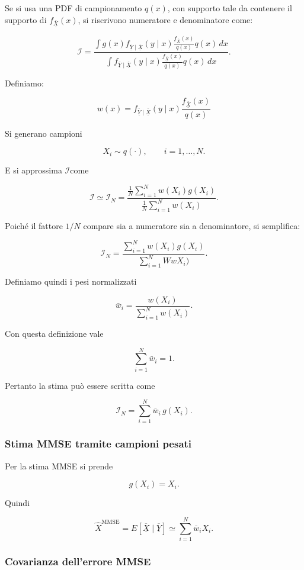 \documentclass[11pt,a4paper]{article}
\begin{document}
Se si usa una PDF di campionamento \(q(x)\), con supporto tale da contenere il supporto di \(f_{\overline{\underline{X}}}(x)\), si riscrivono  numeratore e denominatore come:

\[
\mathcal{I} =  \frac{
\displaystyle
\int g(x)f_{\overline{\underline{Y}}\mid \overline{\underline{X}}}(y\mid x)\frac{f_{\overline{\underline{X}}}(x)}{q(x)}q(x)\,dx
}{
\displaystyle
\int f_{\overline{\underline{Y}}\mid \overline{\underline{X}}}(y\mid x)\frac{f_{\overline{\underline{X}}}(x)}{q(x)}q(x)\,dx
}.
\]

Definiamo:

\[
w(x)
=
f_{\overline{\underline{Y}}\mid \overline{\underline{X}}}(y\mid x)\frac{f_{\overline{\underline{X}}}(x)}{q(x)}
\]


Si generano campioni

\[
X_i \sim q(\cdot),
\qquad i=1,\dots,N.
\]


E si approssima $\mathcal{I}$come

\[
\mathcal{I}
\simeq
\mathcal{I}_N
=
\frac{
\frac{1}{N}\sum_{i=1}^{N} w(X_i)g(X_i)
}{
\frac{1}{N}\sum_{i=1}^{N} w(X_i)
}.
\]

Poiché il fattore \(1/N\) compare sia a numeratore sia a denominatore, si semplifica:

\[
\mathcal{I}_N
=
\frac{
\sum_{i=1}^{N} w(X_i)g(X_i)
}{
\sum_{i=1}^{N} WwX_i)
}.
\]

Definiamo quindi i pesi normalizzati

\[
\bar w_i
=
\frac{w(X_i)}
{\displaystyle \sum_{i=1}^{N} w(X_i)}.
\]

Con questa definizione vale

\[
\sum_{i=1}^{N}\bar w_i = 1.
\]

Pertanto la stima può essere scritta come

\[
\mathcal{I}_N
=
\sum_{i=1}^{N}\bar w_i\,g(X_i).
\]

\subsubsection*{Stima MMSE tramite campioni pesati}

Per la stima MMSE si prende

\[
g(X_i)=X_i.
\]

Quindi

\[
\hat X^{\mathrm{MMSE}}
=
E[\overline{\underline{X}}\mid \overline{\underline{Y}}]
\simeq
\sum_{i=1}^{N}\bar w_i X_i.
\]

\subsubsection*{Covarianza dell'errore MMSE}
\end{document}
